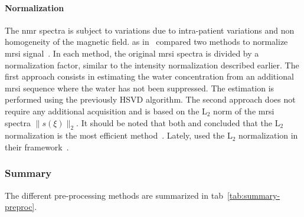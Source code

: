 \paragraph{Normalization}
The \ac{nmr} spectra is subject to variations due to intra-patient variations and non homogeneity of the magnetic field.
\citeauthor{Parfait2012} as in~\cite{Devos2004} compared two methods to normalize \ac{mrsi} signal~\cite{Parfait2012}.
In each method, the original \ac{mrsi} spectra is divided by a normalization factor, similar to the intensity normalization described earlier.
The first approach consists in estimating the water concentration from an additional \ac{mrsi} sequence where the water has not been suppressed.
The estimation is performed using the previously HSVD algorithm.
The second approach does not require any additional acquisition and is based on the L$_2$ norm of the \ac{mrsi} spectra $\|s(\xi)\|_2$. 
It should be noted that both \citeauthor{Parfait2012} and \citeauthor{Devos2004} concluded that the L$_2$ normalization is the most efficient method~\cite{Parfait2012}.
Lately, \citeauthor{trigui2017automatic} used the L$_2$ normalization in their framework~\cite{trigui2016classification,trigui2017automatic}.
 

\subsubsection{Summary}

The different pre-processing methods are summarized in \acs{tab}~\ref{tab:summary-preproc}.

